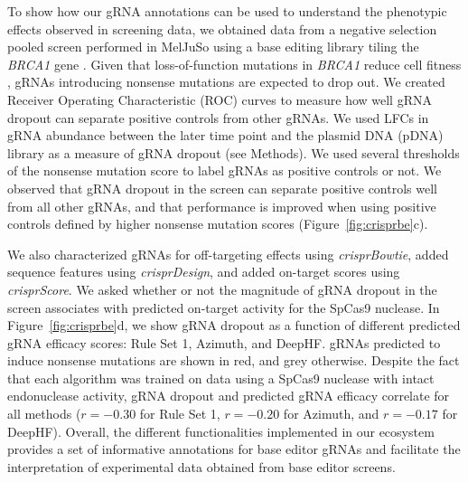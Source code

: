 \documentclass[pdftex,english,10pt]{article}
\begin{document}
To show how our gRNA annotations can be used to understand the phenotypic effects observed in screening data, we obtained data from a negative selection pooled screen performed in MelJuSo using a base editing library tiling the \textit{BRCA1} gene \citep{hanna2021massively}. Given that loss-of-function mutations in \textit{BRCA1} reduce cell fitness \citep{findlay2018accurate}, gRNAs introducing nonsense mutations are expected to drop out. We created Receiver Operating Characteristic (ROC) curves to measure how well gRNA dropout can separate positive controls from other gRNAs. We used LFCs in gRNA abundance between the later time point and the plasmid DNA (pDNA) library as a measure of gRNA dropout (see Methods). We used several thresholds of the nonsense mutation score to label gRNAs as positive controls or not. We observed that gRNA dropout in the screen can separate positive controls well from all other gRNAs, and that performance is improved when using positive controls defined by higher nonsense mutation scores (Figure~\ref{fig:crisprbe}c). 


We also characterized gRNAs for off-targeting effects using \textit{crisprBowtie}, added sequence features using \textit{crisprDesign}, and added on-target scores using \textit{crisprScore}. We asked whether or not the magnitude of gRNA dropout in the screen associates with predicted on-target activity for the SpCas9 nuclease. In Figure~\ref{fig:crisprbe}d, we show gRNA dropout as a function of different predicted gRNA efficacy scores: Rule Set 1, Azimuth, and DeepHF.  gRNAs predicted to induce nonsense mutations are shown in red, and grey otherwise. Despite the fact that each algorithm was trained on data using a SpCas9 nuclease with intact endonuclease activity, gRNA dropout and predicted gRNA efficacy correlate for all methods ($r = -0.30$ for Rule Set 1, $r =  -0.20$ for Azimuth, and $r = -0.17$ for DeepHF). Overall, the different functionalities implemented in our ecosystem provides a set of informative annotations for base editor gRNAs and facilitate the interpretation of experimental data obtained from base editor screens.
\end{document}

